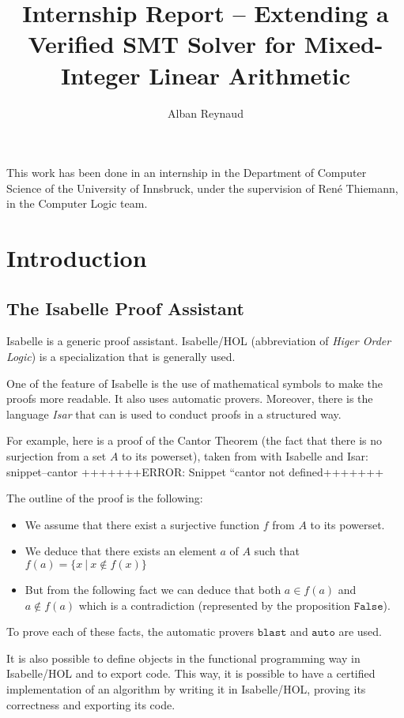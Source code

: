 \documentclass{article}
\title{Internship Report -- Extending a Verified SMT Solver for Mixed-Integer
Linear Arithmetic}
\author{Alban Reynaud}
\date{}
\newcommand{\Snippet}[1]{%
  \ifcsname snippet--#1\endcsname{\csname snippet--#1\endcsname}%
  \else+++++++ERROR: Snippet ``#1 not defined+++++++ \fi}
\begin{document}
\maketitle

This work has been done in an internship in the Department of Computer Science
of the University of Innsbruck, under the supervision of René Thiemann, in the
Computer Logic team.

\tableofcontents

\begin{abstract}
\end{abstract}

\section{Introduction}
\subsection{The Isabelle Proof Assistant}
Isabelle \cite{Isabelle} is a generic proof assistant. Isabelle/HOL
(abbreviation of \textit{Higer Order Logic}) is a specialization that is
generally used.

One of the feature of Isabelle is the use of mathematical symbols to make the
proofs more readable. It also uses automatic provers.
Moreover, there is the language \textit{Isar} that can is used to conduct proofs
in a structured way.

For example, here is a proof of the Cantor Theorem (the fact that there is no
surjection from a set $A$ to its powerset), taken from
\cite[Section 5.1]{ConcreteSemantics}
with Isabelle and Isar:
\Snippet{cantor}

The outline of the proof is the following:
\begin{itemize}
  \item We assume that there exist a surjective function $f$ from $A$ to
    its powerset.
  \item We deduce that there exists an element $a$ of $A$ such that
    $f(a) = \{x~|~x \notin f(x)\}$
  \item But from the following fact we can deduce that both $a \in f(a)$ and $a
    \notin f(a)$ which is a contradiction (represented by the proposition
    $\mathtt{False}$).
\end{itemize}
To prove each of these facts, the automatic provers $\mathtt{blast}$ and
$\mathtt{auto}$ are used.

It is also possible to define objects in the functional programming way in
Isabelle/HOL and to export code. This way, it is possible to have a certified
implementation of an algorithm by writing it in Isabelle/HOL, proving its
correctness and exporting its code.
\end{document}
